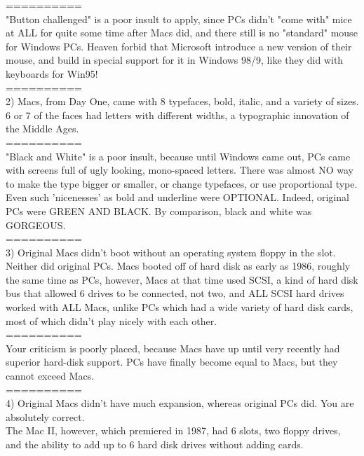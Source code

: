 \documentclass[11pt,twoside,a4paper]{article}
\begin{document}
\begin{multicols*}{2}
==========~\\
"Button challenged" is a poor insult to apply, since PCs didn't "come with" mice at ALL for quite some time after Macs did, and there still is no "standard" mouse for Windows PCs. Heaven forbid that Microsoft introduce a new version of their mouse, and build in special support for it in Windows 98/9, like they did with keyboards for Win95!~\\
==========~\\

2) Macs, from Day One, came with 8 typefaces, bold, italic, and a variety of sizes. 6 or 7 of the faces had letters with different widths, a typographic innovation of the Middle Ages.~\\

==========~\\
"Black and White" is a poor insult, because until Windows came out, PCs came with screens full of ugly looking, mono-spaced letters. There was almost NO way to make the type bigger or smaller, or change typefaces, or use proportional type. Even such 'nicenesses' as bold and underline were OPTIONAL. Indeed, original PCs were GREEN AND BLACK. By comparison, black and white was GORGEOUS.~\\
==========~\\

3) Original Macs didn't boot without an operating system floppy in the slot. Neither did original PCs. Macs booted off of hard disk as early as 1986, roughly the same time as PCs, however, Macs at that time used SCSI, a kind of hard disk bus that allowed 6 drives to be connected, not two, and ALL SCSI hard drives worked with ALL Macs, unlike PCs which had a wide variety of hard disk cards, most of which didn't play nicely with each other.~\\

==========~\\
Your criticism is poorly placed, because Macs have up until very recently had superior hard-disk support. PCs have finally become equal to Macs, but they cannot exceed Macs.~\\
==========~\\

4) Original Macs didn't have much expansion, whereas original PCs did. You are absolutely correct.~\\

The Mac II, however, which premiered in 1987, had 6 slots, two floppy drives, and the ability to add up to 6 hard disk drives without adding cards.~\\


\end{multicols*}
\end{document}
